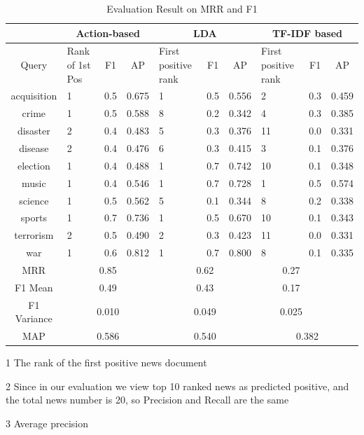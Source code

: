 \begin{table}[th]
\centering
\caption{Evaluation Result on MRR and F1}
\begin{threeparttable}[b]
  \begin{tabular}{ c | p{1.7cm} | c | c | p{1.7cm} | c | c | p{1.7cm} | c | c } \hline
  & \multicolumn{3}{c|}{Action-based} &  \multicolumn{3}{c|}{LDA} &  \multicolumn{3}{c}{TF-IDF based} \\
  \hline \hline
  Query & Rank of 1st Pos\tnote{1} & F1\tnote{2} & AP \tnote{3} & First positive rank & F1 & AP & First positive rank & F1 & AP\\ \hline
  acquisition & 1 & 0.5 & 0.675 & 1 & 0.5 & 0.556 & 2 & 0.3 & 0.459 \\ \hline
  crime       & 1 & 0.5 & 0.588 & 8 & 0.2 & 0.342 & 4 & 0.3 & 0.385\\ \hline
  disaster    & 2 & 0.4 & 0.483 & 5 & 0.3 & 0.376 & 11 & 0.0 & 0.331 \\ \hline
  disease     & 2 & 0.4 & 0.476 & 6 & 0.3 & 0.415 & 3 & 0.1 & 0.376 \\ \hline
  election    & 1 & 0.4 & 0.488 & 1 & 0.7 & 0.742 & 10 & 0.1 & 0.348 \\ \hline
  music       & 1 & 0.4 & 0.546 & 1 & 0.7 & 0.728 & 1 & 0.5 & 0.574\\ \hline
  science     & 1 & 0.5 & 0.562 & 5 & 0.1 & 0.344 & 8 & 0.2 & 0.338\\ \hline
  sports      & 1 & 0.7 & 0.736 & 1 & 0.5 & 0.670 & 10 & 0.1 & 0.343\\ \hline
  terrorism   & 2 & 0.5 & 0.490 & 2 & 0.3 & 0.423 & 11 & 0.0 & 0.331\\ \hline
  war         & 1 & 0.6 & 0.812 & 1 & 0.7 & 0.800 & 8 & 0.1 & 0.335 \\ \hline
  MRR         & \multicolumn{3}{c|}{0.85} & \multicolumn{3}{c|}{0.62} & \multicolumn{2}{c}{0.27} \\ \hline
  F1 Mean     & \multicolumn{3}{c|}{0.49} & \multicolumn{3}{c|}{0.43} & \multicolumn{2}{c}{0.17} \\ \hline
  F1 Variance     & \multicolumn{3}{c|}{0.010} & \multicolumn{3}{c|}{0.049} & \multicolumn{2}{c}{0.025} \\ \hline
  MAP &  \multicolumn{3}{c|}{0.586} & \multicolumn{3}{c|}{0.540} &\multicolumn{3}{c}{0.382} \\ \hline
  \end{tabular}
  \begin{tablenotes}
    \item [1] The rank of the first positive news document
    \item [2] Since in our evaluation we view top 10 ranked news as predicted positive, and the total news number is 20, so Precision and Recall are the same
    \item [3] Average precision
    \end{tablenotes}
      \end{threeparttable}
\end{table}
